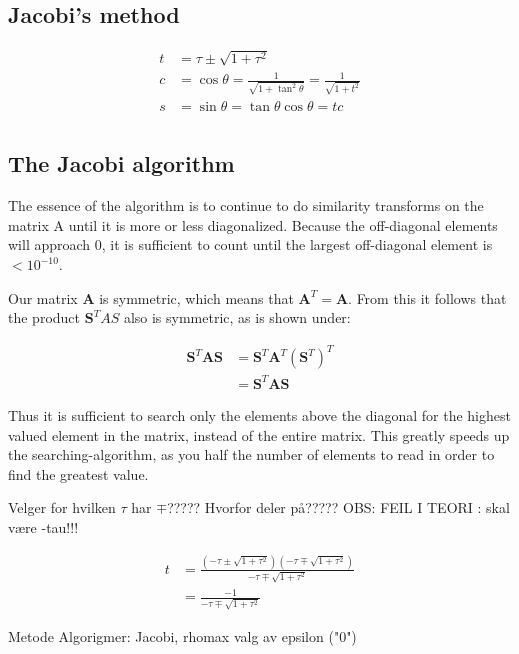 \subsection{Jacobi's method}

\begin{align*}
t &= \tau \pm \sqrt{1+\tau^2}\\ 
c &= \cos \theta = \frac{1}{\sqrt{1+\tan^2\theta}} = \frac{1}{\sqrt{1+t^2}}\\
s &= \sin \theta = \tan \theta \cos \theta = t c\\
\end{align*}

\subsection{The Jacobi algorithm}

The essence of the algorithm is to continue to do similarity transforms on the matrix A until it is more or less diagonalized. Because the off-diagonal elements will approach $ 0 $, it is sufficient to count until the largest off-diagonal element is $ < 10^{-10} $. 

Our matrix \textbf{A} is symmetric, which means that $ \textbf{A}^T = \textbf{A} $. From this it follows that the product $ \textbf{S}^TAS $ also is symmetric, as is shown under:

\begin{align}
\textbf{S}^T\textbf{AS} &= \textbf{S}^T\textbf{A}^T(\textbf{S}^T)^T\\
&= \textbf{S}^T\textbf{AS} 
\end{align}

Thus  it is sufficient to search only the elements above the diagonal for the highest valued element in the matrix, instead of the entire matrix. This greatly speeds up the searching-algorithm, as you half the number of elements to read in order to find the greatest value. 



Velger for hvilken $ \tau $ har $ \mp $?????
Hvorfor deler på?????
OBS: FEIL I TEORI : skal være -tau!!!



\begin{align}
t &= \frac{(-\tau \pm \sqrt{1+\tau^2})(-\tau \mp \sqrt{1+ \tau^2})}{-\tau \mp \sqrt{1+\tau^2}}\\
&= \frac{-1}{-\tau \mp \sqrt{1+\tau^2}}
\end{align}

	Metode
Algorigmer: Jacobi, rhomax
valg av epsilon ("0")








